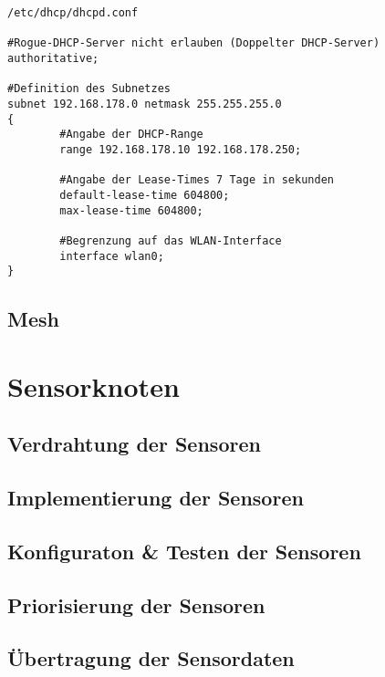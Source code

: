 \begin{verbatim}
/etc/dhcp/dhcpd.conf

#Rogue-DHCP-Server nicht erlauben (Doppelter DHCP-Server)
authoritative;

#Definition des Subnetzes
subnet 192.168.178.0 netmask 255.255.255.0
{
        #Angabe der DHCP-Range
        range 192.168.178.10 192.168.178.250;

        #Angabe der Lease-Times 7 Tage in sekunden
        default-lease-time 604800;
        max-lease-time 604800;

        #Begrenzung auf das WLAN-Interface
        interface wlan0;
}

\end{verbatim}
%

\subsection{Mesh}
\section{Sensorknoten} %
\subsection{Verdrahtung der Sensoren}
\subsection{Implementierung der Sensoren}
\subsection{Konfiguraton & Testen der Sensoren}
\subsection{Priorisierung der Sensoren}
\subsection{Übertragung der Sensordaten}

